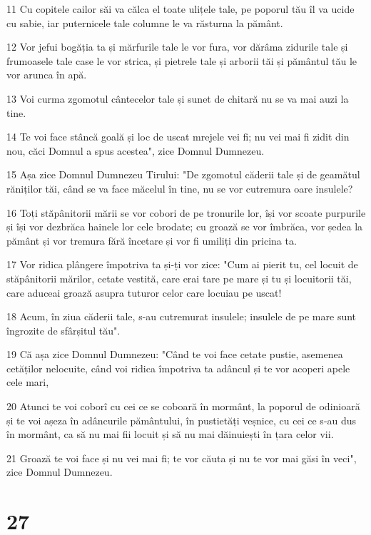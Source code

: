 \par 11 Cu copitele cailor săi va călca el toate ulițele tale, pe poporul tău îl va ucide cu sabie, iar puternicele tale columne le va răsturna la pământ.
\par 12 Vor jefui bogăția ta și mărfurile tale le vor fura, vor dărâma zidurile tale și frumoasele tale case le vor strica, și pietrele tale și arborii tăi și pământul tău le vor arunca în apă.
\par 13 Voi curma zgomotul cântecelor tale și sunet de chitară nu se va mai auzi la tine.
\par 14 Te voi face stâncă goală și loc de uscat mrejele vei fi; nu vei mai fi zidit din nou, căci Domnul a spus acestea", zice Domnul Dumnezeu.
\par 15 Așa zice Domnul Dumnezeu Tirului: "De zgomotul căderii tale și de geamătul răniților tăi, când se va face măcelul în tine, nu se vor cutremura oare insulele?
\par 16 Toți stăpânitorii mării se vor cobori de pe tronurile lor, își vor scoate purpurile și își vor dezbrăca hainele lor cele brodate; cu groază se vor îmbrăca, vor ședea la pământ și vor tremura fără încetare și vor fi umiliți din pricina ta.
\par 17 Vor ridica plângere împotriva ta și-ți vor zice: "Cum ai pierit tu, cel locuit de stăpânitorii mărilor, cetate vestită, care erai tare pe mare și tu și locuitorii tăi, care aduceai groază asupra tuturor celor care locuiau pe uscat!
\par 18 Acum, în ziua căderii tale, s-au cutremurat insulele; insulele de pe mare sunt îngrozite de sfârșitul tău".
\par 19 Că așa zice Domnul Dumnezeu: "Când te voi face cetate pustie, asemenea cetăților nelocuite, când voi ridica împotriva ta adâncul și te vor acoperi apele cele mari,
\par 20 Atunci te voi coborî cu cei ce se coboară în mormânt, la poporul de odinioară și te voi așeza în adâncurile pământului, în pustietăți veșnice, cu cei ce s-au dus în mormânt, ca să nu mai fii locuit și să nu mai dăinuiești în țara celor vii.
\par 21 Groază te voi face și nu vei mai fi; te vor căuta și nu te vor mai găsi în veci", zice Domnul Dumnezeu.

\chapter{27}

